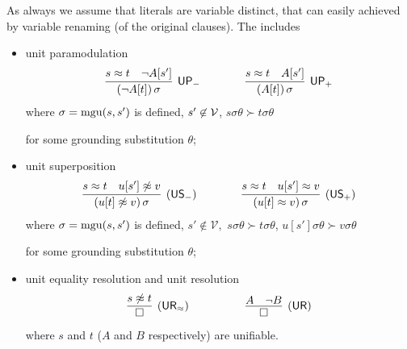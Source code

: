 



\begin{definition}\label{def:unit-superpositin-calculus}
	As always we assume that literals are variable distinct, 
	that can easily achieved by variable renaming (of the original clauses).
	The  includes
	\begin{itemize}
		\item unit paramodulation
		\begin{gather*}
		\infer
		[\mathsf{UP_-}]
		{(\lnot A[t])\,\sigma}
		{s\mEQ t&\lnot A[s']}
		\qquad\qquad
		\infer
		[\mathsf{UP_+}]
		{(A[t])\,\sigma}
		{s\mEQ t&A[s']}
		\end{gather*}
		where \( \sigma=\operatorname{mgu}(s,s') \) is defined,
		\( s'\not\in\mathcal{V} \),
		\( s\sigma\theta\succ t\sigma\theta \)

		for some grounding substitution \( \theta \);

		\item unit superposition
		\begin{gather*}
		\infer
		[\mathsf{(US_-)}]
		{(u[t]\mNE v)\,\sigma}
		{s\mEQ t&u[s']\mNE v}
		\qquad\qquad
		\infer
		[\mathsf{(US_+)}]
		{(u[t]\mEQ v)\,\sigma}
		{s\mEQ t&u[s']\mEQ v}
		\end{gather*}
		where \( \sigma=\operatorname{mgu}(s,s') \) is defined,
		\( s'\not\in\mathcal{V}, \)
		\( s\sigma\theta\succ t\sigma\theta \),
		\( u[s']\sigma\theta\succ v\sigma\theta \)

		for some grounding substitution \( \theta \);
		\item unit equality resolution and unit resolution
		\begin{gather*}
		\infer
		[\mathsf{(UR_\mEQ)}]
		{\emptyclause}
		{s\mNE t}
		\quad\quad\quad\qquad
		\infer
		[\mathsf{(UR)}]
		{\emptyclause}
		{A&\lnot B}
		\end{gather*}
		where \( s \) and \( t \) (\( A \) and \( B \) respectively) are unifiable.
	\end{itemize}
\end{definition}